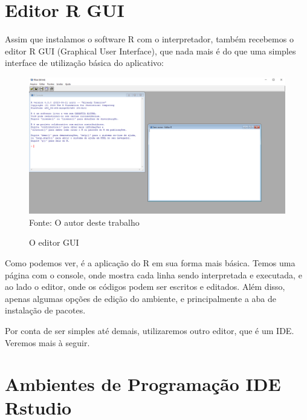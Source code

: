 	\section{Editor R GUI}
	Assim que instalamos o software R com o interpretador, também recebemos o editor R GUI (Graphical User Interface), que nada mais é do que uma simples interface de utilização básica do aplicativo:\begin{figure}[H]
		\centering
		\caption{O editor GUI}
		\includegraphics[width=1.0\linewidth]{Prints/screenshot027}
		\label{fig:screenshot027}
		{\tiny \sf Fonte: O autor deste trabalho }
	\end{figure}
	Como podemos ver, é a aplicação do R em sua forma mais básica. Temos uma página com o console, onde mostra cada linha sendo interpretada e executada, e ao lado o editor, onde os códigos podem ser escritos e editados. Além disso, apenas algumas opções de edição do ambiente, e principalmente a aba de instalação de pacotes.\par
	Por conta de ser simples até demais, utilizaremos outro editor, que é um IDE. Veremos mais à seguir.
    \section{Ambientes de Programa\c{c}\~{a}o IDE Rstudio}
    
